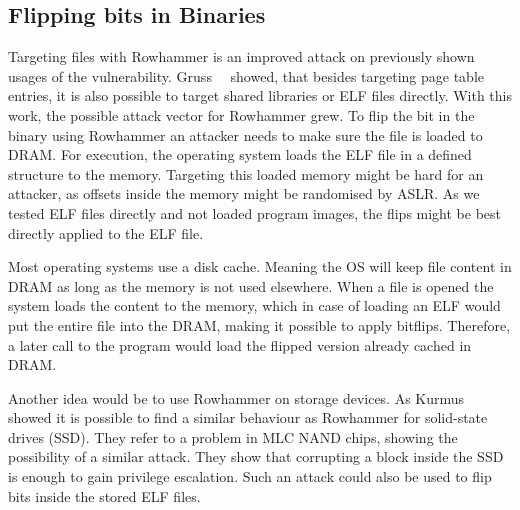\subsection{Flipping bits in Binaries}

Targeting files with Rowhammer is an improved attack on previously shown usages
of the vulnerability. Gruss~\etal~\cite{flipinthewall} showed, that besides
targeting page table entries, it is also possible to target shared libraries or
ELF files directly. With this work, the possible attack vector for Rowhammer
grew. To flip the bit in the binary using Rowhammer an attacker needs to make
sure the file is loaded to DRAM. For execution, the operating system loads the
ELF file in a defined structure to the memory. Targeting this loaded memory
might be hard for an attacker, as offsets inside the memory might be
randomised by ASLR. As we tested ELF files directly and not loaded program
images, the flips might be best directly applied to the ELF file.

Most operating systems use a disk cache. Meaning the OS will keep file content
in DRAM as long as the memory is not used elsewhere. When a file is opened the
system loads the content to the memory, which in case of loading an ELF would
put the entire file into the DRAM, making it possible to apply bitflips.
Therefore, a later call to the program would load the flipped version already
cached in DRAM.

Another idea would be to use Rowhammer on storage devices. As
Kurmus~\etal~\cite{rowssdhammer} showed it is possible to find a similar
behaviour as Rowhammer for solid-state drives (SSD). They refer to a problem in
MLC NAND chips, showing the possibility of a similar attack. They show that
corrupting a block inside the SSD is enough to gain privilege escalation. Such
an attack could also be used to flip bits inside the stored ELF files.

